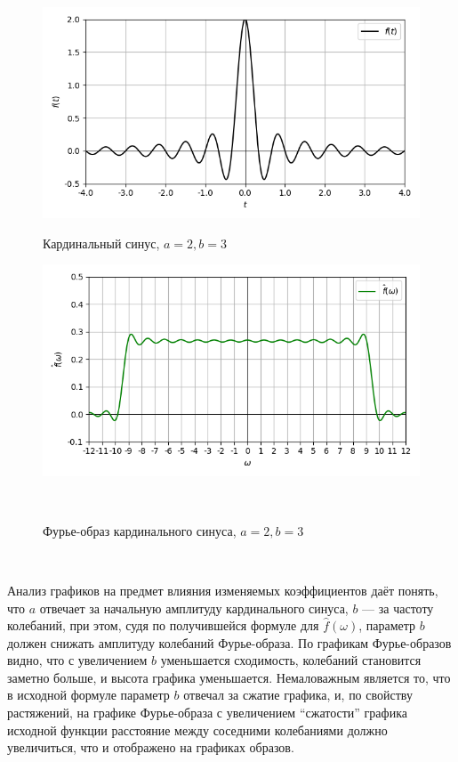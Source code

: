 \documentclass[a4paper]{article}
\begin{document}
\begin{figure}[H]
        \begin{minipage}{0.5\textwidth}
        \centering \includegraphics[width=\textwidth]{sinc/real_graph_2_3.png}
        \caption{Кардинальный синус, $a = 2, b = 3$}
    \end{minipage}\hfill
    \begin{minipage}{0.5\textwidth}
        \centering \includegraphics[width=\textwidth]{sinc/real_fourier_2_3.png}
        \caption{Фурье-образ кардинального синуса, $a = 2, b = 3$}
    \end{minipage}\\[1em]
\end{figure}\noindent\

Анализ графиков на предмет влияния изменяемых коэффициентов даёт понять, что $a$ отвечает за начальную амплитуду кардинального синуса, $b$ --- за частоту колебаний, при этом, судя по получившейся формуле для $\hat{f}(\omega)$, параметр $b$ должен снижать амплитуду колебаний Фурье-образа. По графикам Фурье-образов видно, что с увеличением $b$ уменьшается сходимость, колебаний становится заметно больше, и высота графика уменьшается. Немаловажным является то, что в исходной формуле параметр $b$ отвечал за сжатие графика, и, по свойству растяжений, на графике Фурье-образа с увеличением ``сжатости'' графика исходной функции расстояние между соседними колебаниями должно увеличиться, что и отображено на графиках образов.\
\end{document}
